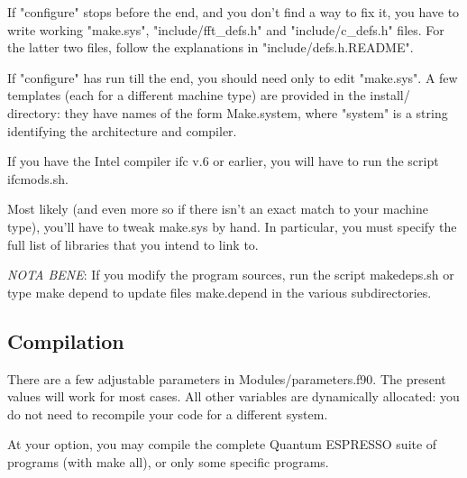 \documentclass[12pt,a4paper]{article}
\begin{document}
If "configure" stops before the end, and you don't find a way to fix
it, you have to write working "make.sys", "include/fft\_defs.h" and
"include/c\_defs.h" files. 
For the latter two files, follow the explanations in 
"include/defs.h.README". 

If "configure" has run till the end, you should need only to
edit "make.sys". A few templates (each for a different machine type)
are provided in the install/ directory: they have names of the
form Make.system, where "system" is a string identifying the 
architecture and compiler.

If you have the Intel compiler ifc v.6 or earlier, you will have to 
run the script ifcmods.sh.
    
Most likely (and even more so if there isn't an exact match to your 
machine type), you'll have to tweak make.sys by hand. In particular, 
you must
specify the full list of libraries that you intend to link to.
    
{\em NOTA BENE}:
If you modify the program sources, run the script makedeps.sh
or type make depend to update files make.depend in the various 
subdirectories.

\subsection{Compilation}

There are a few adjustable parameters in Modules/parameters.f90. The
present values will work for most cases. All other variables are dynamically
allocated: you do not need to recompile your code for a different system.
    
At your option, you may compile the complete Quantum ESPRESSO
suite of programs (with make all), or only some specific programs.
    
\end{document}
